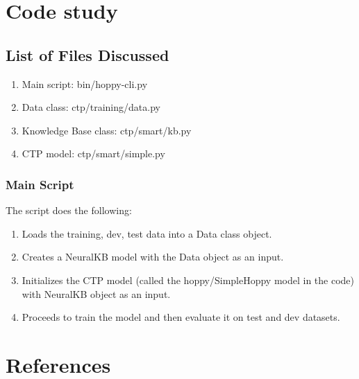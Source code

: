 \documentclass[Other]{iitddiss}
\begin{document}
\chapter{Code study}
\section{List of Files Discussed}
\begin{enumerate}
\item Main script: bin/hoppy-cli.py
\item Data class: ctp/training/data.py
\item Knowledge Base class: ctp/smart/kb.py
\item CTP model: ctp/smart/simple.py
\end{enumerate}

\subsection{Main Script}
The script does the following:

\begin{enumerate}
\item Loads the training, dev, test data into a Data class object.
\item Creates a NeuralKB model with the Data object as an input.
\item Initializes the CTP model (called the hoppy/SimpleHoppy model in the code) with NeuralKB object as an input.
\item Proceeds to train the model and then evaluate it on test and dev datasets.
\end{enumerate}





\begin{singlespace}
  
\end{singlespace}



\chapter{References}
\end{document}

